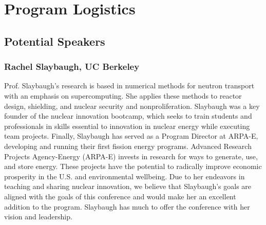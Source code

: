 \section{Program Logistics}

\subsection{Potential Speakers}

\subsubsection{Rachel Slaybaugh, UC Berkeley}
Prof. Slaybaugh's research is based in numerical methods for neutron transport with an emphasis on supercomputing. She applies these methods to reactor design, shielding, and nuclear security and nonproliferation. Slaybaugh was a key founder of the nuclear innovation bootcamp, which seeks to train students and professionals in skills essential to innovation in nuclear energy while executing team projects. Finally, Slaybaugh has served as a Program Director at ARPA-E, developing and running their first fission energy programs. Advanced Research Projects Agency-Energy (ARPA-E) invests in research for ways to generate, use, and store energy. These projects have the potential to radically improve economic prosperity in the U.S. and environmental wellbeing. Due to her endeavors in teaching and sharing nuclear innovation, we believe that Slaybaugh's goals are aligned with the goals of this conference and would make her an excellent addition to the program. Slaybaugh has much to offer the conference with her vision and leadership.

